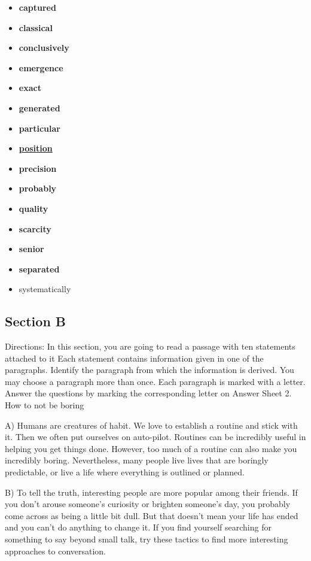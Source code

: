 \documentclass[UTF8,11pt]{ctexart}
\begin{document}
\begin{itemize}[leftmargin=2em,itemsep=.2em,topsep=.4em]\item[A.] \textbf{captured}
\item[B.] \textbf{classical}
\item[C.] \textbf{conclusively}
\item[D.] \textbf{emergence}
\item[E.] \textbf{exact}
\item[F.] \textbf{generated}
\item[G.] \textbf{particular}
\item[H.] \textbf{\uline{position}}
\item[I.] \textbf{precision}
\item[J.] \textbf{probably}
\item[K.] \textbf{quality}
\item[L.] \textbf{scarcity}
\item[M.] \textbf{senior}
\item[N.] \textbf{separated}
\item[O.] systematically
\end{itemize}

\subsection*{Section B}


Directions: In this section, you are going to read a passage with ten statements attached to it Each statement contains information given in one of the paragraphs. Identify the paragraph from which the information is derived. You may choose a paragraph more than once. Each paragraph is marked with a letter. Answer the questions by marking the corresponding letter on Answer Sheet 2. How to not be boring


A) Humans are creatures of habit. We love to establish a routine and stick with it. Then we often put ourselves on auto-pilot. Routines can be incredibly useful in helping you get things done. However, too much of a routine can also make you incredibly boring. Nevertheless, many people live lives that are boringly predictable, or live a life where everything is outlined or planned.


B) To tell the truth, interesting people are more popular among their friends. If you don't arouse someone's curiosity or brighten someone's day, you probably come across as being a little bit dull. But that doesn't mean your life has ended and you can't do anything to change it. If you find yourself searching for something to say beyond small talk, try these tactics to find more interesting approaches to conversation.
\end{document}
